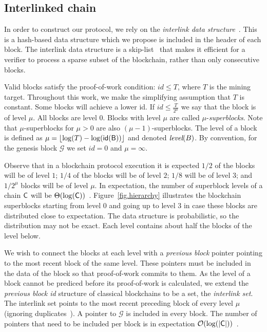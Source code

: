 \subsection{Interlinked chain}\label{sec.interlink}

In order to construct our protocol, we rely on the \emph{interlink data
structure}~\cite{popow}. This is a hash-based data structure which we propose is
included in the header of each block. The interlink data structure is a
skip-list~\cite{skiplist} that makes it efficient for a verifier to process a
sparse subset of the blockchain, rather than only consecutive blocks.

Valid blocks satisfy the proof-of-work condition: $id \leq T$, where $T$ is the
mining target. Throughout this work, we make the simplifying assumption that $T$
is constant.
Some blocks will achieve a lower id. If $id \leq
\frac{T}{2^\mu}$ we say that the block is of level $\mu$. All blocks are level
$0$. Blocks with level $\mu$ are called $\mu$-\emph{superblocks}.
Note that $\mu$-superblocks for $\mu > 0$ are also $(\mu - 1)$-superblocks. The level of a
block is defined as $\mu = \left \lfloor \log(T) - \log(\sf{id}(B)) \right
\rfloor$ and denoted $\emph{level}(B)$. By convention, for the genesis block
$\mathcal{G}$ we set $id = 0$ and $\mu = \infty$.

Observe that in a blockchain protocol execution it is expected $1/2$ of the
blocks will be of level $1$; $1/4$ of the blocks will be of level $2$; $1/8$
will be of level $3$; and $1/2^\mu$ blocks will be of level $\mu$. In
expectation, the number of superblock levels of a chain $\mathsf{C}$ will be
$\Theta(\log(\mathsf{C}))$~\cite{popow}. Figure~\ref{fig.hierarchy} illustrates the
blockchain superblocks starting from level $0$ and going up to level $3$ in case
these blocks are distributed close to expectation. The data structure is
probabilistic, so the distribution may not be exact. Each level
contains about half the blocks of the level below.

We wish to connect the blocks at each level with a \emph{previous block}
pointer pointing to the most recent block of the same level. These pointers must
be included in the data of the block so that proof-of-work commits to them. As
the level of a block cannot be prediced before its proof-of-work is calculated,
we extend the \emph{previous block id} structure of classical blockchains to be
a set, the \emph{interlink set}. The interlink set points to the most
recent preceding block of every level $\mu$ (ignoring
duplicates~\cite{gtklocker}). A pointer to $\mathcal{G}$ is included in every
block. The number of pointers that need to be included per block is in
expectation $\mathcal{O}(\log(|\mathsf{C}|))$~\cite{compactsuperblocks}.


